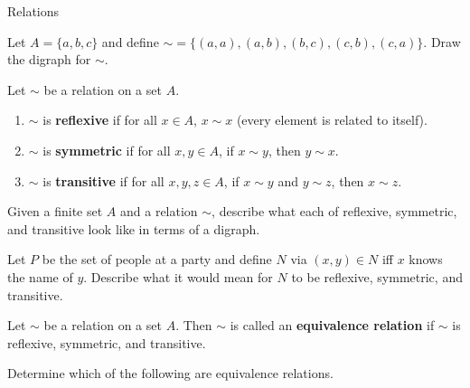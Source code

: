 \begin{section}{Relations}
\begin{example}
\end{example}

\begin{exercise}
Let \(A=\{a,b,c\}\) and define \(\sim=\{(a,a),(a,b),(b,c),(c,b),(c,a)\}\).  Draw the digraph for \(\sim\).
\end{exercise}

\begin{definition}
Let \(\sim\) be a relation on a set \(A\).
\begin{enumerate}
\item \(\sim\) is \textbf{reflexive} if for all \(x\in A\), \(x\sim x\) (every element is related to itself).
\item \(\sim\) is \textbf{symmetric} if for all \(x,y\in A\), if \(x\sim y\), then \(y\sim x\).
\item \(\sim\) is \textbf{transitive} if for all \(x,y,z\in A\), if \(x\sim y\) and \(y\sim z\), then \(x\sim z\).
\end{enumerate}
\end{definition}

\begin{exercise}
Given a finite set \(A\) and a relation \(\sim\), describe what each of reflexive, symmetric, and transitive look like in terms of a digraph.
\end{exercise}

\begin{exercise}
Let \(P\) be the set of people at a party and define \(N\) via \((x,y)\in N\) iff \(x\) knows the name of \(y\).  Describe what it would mean for \(N\) to be reflexive, symmetric, and transitive.
\end{exercise}

\begin{definition}
Let \(\sim\) be a relation on a set \(A\).  Then \(\sim\) is called an \textbf{equivalence relation} if \(\sim\) is reflexive, symmetric, and transitive.
\end{definition}

\begin{exercise}
Determine which of the following are equivalence relations.


\end{exercise}
\end{section}
